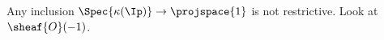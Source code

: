 \begin{nonexample}
Any inclusion $\Spec{\kappa(\Ip)} \rightarrow \projspace{1}$ is not restrictive. 
Look at $\sheaf{O}(-1)$.
\end{nonexample}

